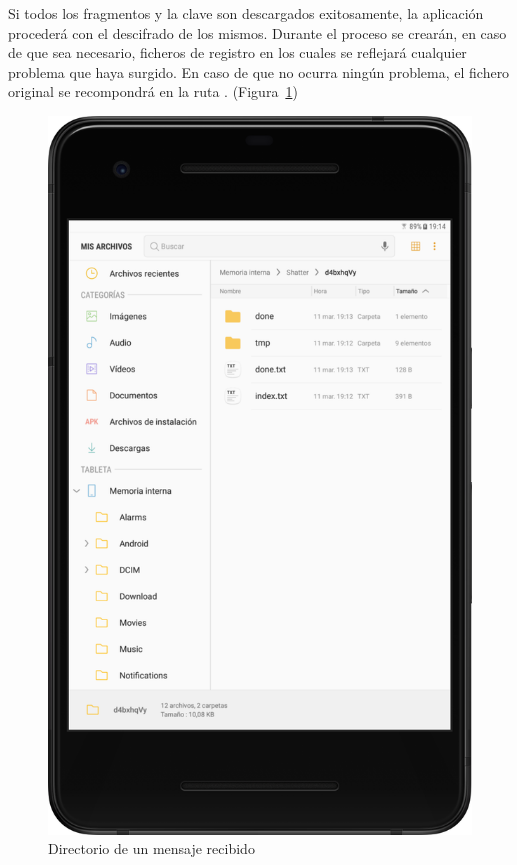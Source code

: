 Si todos los fragmentos y la clave son descargados exitosamente, la aplicación
procederá con el descifrado de los mismos. Durante el proceso se crearán, en
caso de que sea necesario, ficheros de registro en los cuales se reflejará
cualquier problema que haya surgido. En caso de que no ocurra ningún
problema, el fichero original se recompondrá en la ruta
. (Figura~\ref{fig:done})

\begin{figure}[ht]
  \centering
  \includegraphics[scale=0.4]{Figures/done}
  \decoRule
  \caption[Shatter (Mensaje recibido)]{Directorio de un mensaje recibido}
  \label{fig:done}
\end{figure}

